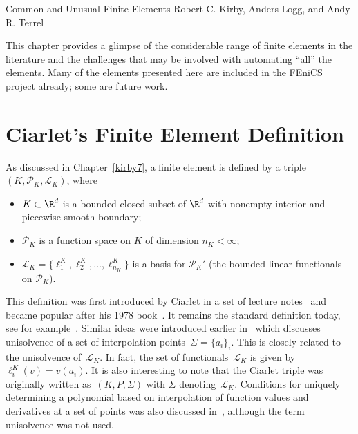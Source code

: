               {Common and Unusual Finite Elements}
              {Robert C. Kirby, Anders Logg, and Andy R. Terrel}

\newcommand{\elementwidth}{5cm}
\newcommand{\elemententry}[1]{\null

\texttt{[image: \#1]}}
\newcommand{\nedelec}{N\'ed\'elec}
\newcommand{\Hdiv}{H(\mathrm{div})}
\newcommand{\Hcurl}{H(\mathrm{curl})}

This chapter provides a glimpse of the considerable range of finite
elements in the literature and the challenges that may be involved
with automating ``all'' the elements. Many of the elements presented
here are included in the FEniCS project already; some are future work.

\section{Ciarlet's Finite Element Definition}

As discussed in Chapter~\ref{kirby7}, a finite element is defined by a
triple $(K, \mathcal{P}_K, \mathcal{L}_K)$, where
\begin{itemize}
\item
  $K \subset \R^d$ is a bounded closed subset of $\R^d$ with nonempty
  interior and piecewise smooth boundary;
\item
  $\mathcal{P}_K$ is a function space on $K$ of dimension $n_K < \infty$;
\item
  $\mathcal{L}_K = \{\ell^K_1, \ell^K_2, \ldots, \ell^K_{n_K}\}$ is a
  basis for $\mathcal{P}_K'$ (the bounded linear functionals on
  $\mathcal{P}_K$).
\end{itemize}

This definition was first introduced by Ciarlet in a set of lecture
notes~\cite{Ciarlet1975} and became popular after his 1978
book~\cite{Ciarlet1978,Ciarlet2002}. It remains the standard
definition today, see for example~\cite{BrennerScott2008}. Similar
ideas were introduced earlier in~\cite{CiarletRaviart1972} which
discusses unisolvence of a set of interpolation points~$\Sigma =
\{a_i\}_i$. This is closely related to the unisolvence of~$\mathcal{L}_K$. In fact, the set of
functionals~$\mathcal{L}_K$ is given by $\ell^K_i(v) = v(a_i)$. It is
also interesting to note that the Ciarlet triple was originally
written as~$(K,P,\Sigma)$ with $\Sigma$
denoting~$\mathcal{L}_K$. Conditions for uniquely determining a
polynomial based on interpolation of function values and derivatives
at a set of points was also discussed in~\cite{BrambleZlamal1970},
although the term unisolvence was not used.

